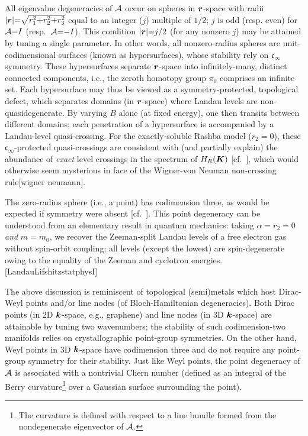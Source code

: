 \documentclass[aps, prb, showpacs, twocolumn, notitlepage, superscriptaddress]{revtex4-1}
\begin{document}
All eigenvalue degeneracies of ${\cal A}$ occur on spheres in $\boldsymbol{r}$-space with radii $|\boldsymbol{r}|{=}\sqrt{r_1^2{+}r_2^2{+}r_3^2}$ equal to an integer ($j$)  multiple of $1/2$;  ${j}$ is odd (resp. even) for  ${\cal A}{=}I$ (resp.\ ${\cal A}{=}{-}I$).  This condition $|\boldsymbol{r}|{=}j/2$ (for any nonzero $j$) may be attained by tuning a single parameter. In other words,
all nonzero-radius spheres are unit-codimensional surfaces (known as hypersurfaces), whose stability rely on $\mathfrak{c}_{\infty}$ symmetry. These hypersurfaces separate $\boldsymbol{r}$-space into infinitely-many, distinct connected components, i.e., the zeroth homotopy group $\pi_0$ comprises an infinite set. Each hypersurface may thus be viewed as a symmetry-protected, topological defect, which separates domains (in $\boldsymbol{r}$-space) where Landau levels are non-quasidegenerate. By varying $B$ alone (at fixed energy), one then transits between different domains; each penetration of a hypersurface is accompanied by a Landau-level quasi-crossing. For the exactly-soluble Rashba model ($r_2{=}0$), these $\mathfrak{c}_{\infty}$-protected quasi-crossings  are consistent with (and partially explain)  the abundance of \textit{exact} level crossings in the spectrum of $H_R(\boldsymbol{K})$ [cf.\ ], which would otherwise seem mysterious in face of  the Wigner-von Neuman non-crossing rule[wigner neumann].


The zero-radius sphere (i.e., a point) has codimension three, as would be expected if symmetry were absent [cf.\ ].    This point degeneracy can be understood from an elementary result in quantum mechanics: taking $\alpha{=}r_2{=}0$ \textit{and} $m{=}m_0$, we recover the Zeeman-split Landau levels of a free electron gas without spin-orbit coupling; all levels (except the lowest) are spin-degenerate owing to the equality of the Zeeman and cyclotron energies.[LandauLifshitzstatphysI]

The above discussion is reminiscent of topological (semi)metals which host Dirac-Weyl points and/or line nodes (of Bloch-Hamiltonian degeneracies). Both Dirac points (in 2D $\boldsymbol{k}$-space, e.g., graphene) and  line nodes (in 3D $\boldsymbol{k}$-space) are attainable by tuning two wavenumbers; the stability of such codimension-two manifolds
 relies on crystallographic point-group symmetries. On the other hand,  Weyl points in 3D $\boldsymbol{k}$-space have codimension three and do not require any  point-group symmetry for their stability. Just like Weyl points, the point degeneracy of ${\cal A}$ is associated with a nontrivial Chern number (defined as an integral of the Berry curvature\footnote{The curvature is defined with respect to a line bundle formed from the nondegenerate eigenvector of ${\cal A}$.} over a Gaussian surface surrounding the point). 
\end{document}

